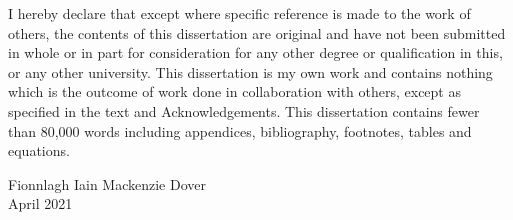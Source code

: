 \begin{declaration}

I hereby declare that except where specific reference is made to the work of others, the contents of this dissertation are original and have not been submitted in whole or in part for consideration for any other degree or qualification in this, or any other university.
This dissertation is my own work and contains nothing which is the outcome of work done in collaboration with others, except as specified in the text and Acknowledgements.
This dissertation contains fewer than 80,000 words including appendices, bibliography, footnotes, tables and equations.

\begin{flushright}
Fionnlagh Iain Mackenzie Dover
\\
April 2021
\end{flushright}

\end{declaration}